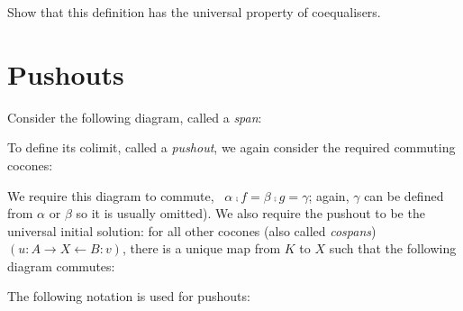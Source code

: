 \begin{exercise}
    Show that this definition has the universal property of coequalisers.
\end{exercise}

\section{Pushouts}

Consider the following diagram, called a \emph{span}:

\begin{center}
\end{center}

To define its colimit, called a \emph{pushout}, we again consider the required
commuting cocones:

\begin{center}
\end{center}

We require this diagram to commute, 
\ie~$\alpha \comp f = \beta \comp g = \gamma$; again, $\gamma$ can be defined
from $\alpha$ or $\beta$ so it is usually omitted).  We also require the
pushout to be the universal initial solution: for all other cocones (also
called \emph{cospans}) $(u: A\to X\leftarrow B: v)$, there is a unique map
from $K$ to $X$ such that the following diagram commutes:
\begin{center}
\end{center}

The following notation is used for pushouts:
\begin{center}
\end{center}

